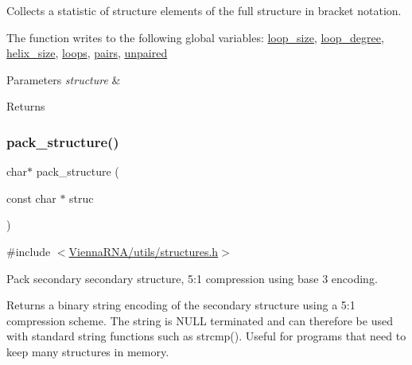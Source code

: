 Collects a statistic of structure elements of the full structure in bracket notation. 

The function writes to the following global variables\+: \mbox{\hyperlink{group__struct__utils__deprecated_ga365a3fad38b21ca8606cb556f2896218}{loop\+\_\+size}}, \mbox{\hyperlink{group__struct__utils__deprecated_ga0518a287aa4a870508cea819029778ab}{loop\+\_\+degree}}, \mbox{\hyperlink{group__struct__utils__deprecated_ga3fce53616c021cbc724fc80b8c1ebeb5}{helix\+\_\+size}}, \mbox{\hyperlink{group__struct__utils__deprecated_ga439fcb9f8d4f9f4d2227fde5fbfecb30}{loops}}, \mbox{\hyperlink{group__struct__utils__deprecated_ga6341cbb704924824e0236c1dce791032}{pairs}}, \mbox{\hyperlink{group__struct__utils__deprecated_gadd2f952597e02d66e1116a9d11d252d6}{unpaired}}


\begin{DoxyParams}{Parameters}
{\em structure} & \\
\hline
\end{DoxyParams}
\begin{DoxyReturn}{Returns}

\end{DoxyReturn}
\mbox{\label{group__struct__utils__deprecated_gac6dfa5e22928c087c6e09ff0054a7ced}} 
\subsubsection{\texorpdfstring{pack\_structure()}{pack\_structure()}}
{\footnotesize\ttfamily char$\ast$ pack\+\_\+structure (\begin{DoxyParamCaption}\item[{const char $\ast$}]{struc }\end{DoxyParamCaption})}



{\ttfamily \#include $<$\mbox{\hyperlink{utils_2structures_8h}{Vienna\+R\+N\+A/utils/structures.\+h}}$>$}



Pack secondary secondary structure, 5\+:1 compression using base 3 encoding. 

Returns a binary string encoding of the secondary structure using a 5\+:1 compression scheme. The string is N\+U\+LL terminated and can therefore be used with standard string functions such as strcmp(). Useful for programs that need to keep many structures in memory.

